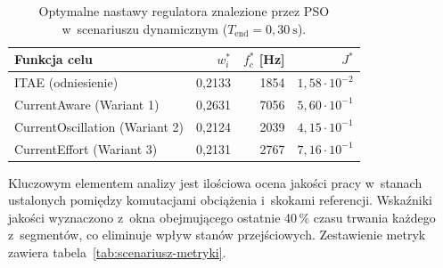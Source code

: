 \begin{table}[h!]
    \centering
    \caption{Optymalne nastawy regulatora znalezione przez PSO w~scenariuszu dynamicznym ($T_{\mathrm{end}} = 0{,}30~\mathrm{s}$).}
    \label{tab:pso-dynamic-opt}
    \begin{tabular}{lrrr}
        \toprule
        \textbf{Funkcja celu} & $w_i^*$ & $f_c^*$ [Hz] & $J^*$ \\
        \midrule
        ITAE (odniesienie)         & 0{,}2133 & 1854 & $1{,}58\cdot 10^{-2}$ \\
        CurrentAware (Wariant 1)     & 0{,}2631 & 7056 & $5{,}60\cdot 10^{-1}$ \\
        CurrentOscillation (Wariant 2)& 0{,}2124 & 2039 & $4{,}15\cdot 10^{-1}$ \\
        CurrentEffort (Wariant 3)    & 0{,}2131 & 2767 & $7{,}16\cdot 10^{-1}$ \\
        \bottomrule
    \end{tabular}
\end{table}

Kluczowym elementem analizy jest ilościowa ocena jakości pracy w~stanach ustalonych pomiędzy komutacjami obciążenia i~skokami referencji. Wskaźniki jakości wyznaczono z~okna obejmującego ostatnie 40\,\% czasu trwania każdego z~segmentów, co eliminuje wpływ stanów przejściowych. Zestawienie metryk zawiera tabela~\ref{tab:scenariusz-metryki}.

